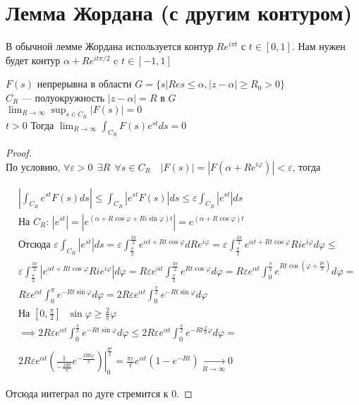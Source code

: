 \documentclass[a4paper, fleqn]{report}
\begin{document}
\section {Лемма Жордана (с другим контуром)}
В обычной лемме Жордана используется контур $Re^{i\pi t}$ с $t \in [0, 1]$. Нам нужен будет контур $\alpha + Re^{i t \pi/2}$ c $t \in [-1, 1]$
\begin{Th*}
	$F(s)$ непрерывна в области $G = \{s | Res \le  \alpha, |z-\alpha| \ge  R_0 > 0\}$ \\
	$C_R$ --- полуокружность $|z-\alpha| = R$ в $G$ \\
	$\lim_{R \to \infty} \sup_{s \in C_R} |F(s)| = 0$ \\
	$t > 0$
	Тогда $\lim_{R \to \infty} \int_{C_R} F(s)e^{st}ds = 0$
\end{Th*}
\begin{proof} $ $\\
По условию, $\forall \varepsilon > 0 \ \  \exists R \ \ \forall s \in C_R \quad \left| F(s) \right| = \left| F\left(\alpha + Re^{i\varphi}\right) \right|  < \varepsilon$, тогда

\begin{align*}
    & \left|\int_{C_R} e^{st} F(s) ds\right| \le
      \int_{C_R} \left|e^{st} F(s)\right| ds \le
      \varepsilon \int_{C_R} \left|e^{st}\right| ds  \\
    & \text{На $C_R$: } \left|e^{st}\right| = \left|e^{\left(\alpha+R\cos\varphi+Ri\sin\varphi\right)t}\right| = e^{\left(\alpha + R\cos\varphi\right) t} \\
    & \text{Отсюда } \varepsilon \int_{C_R} \left|e^{st}\right| ds = 
      \varepsilon \int_{\frac{\pi}{2}}^{\frac{3\pi}{2}} e^{\alpha t + R t \cos \varphi} dRe^{i\varphi} = 
      \varepsilon \int_{\frac{\pi}{2}}^{\frac{3\pi}{2}} e^{\alpha t + R t \cos \varphi} R i e^{i\varphi} d\varphi \le  \\
    & \varepsilon \int_{\frac{\pi}{2}}^{\frac{3\pi}{2}} \left|e^{\alpha t + R t \cos \varphi} R i e^{i\varphi} \right| d\varphi = 
      R\varepsilon e^{\alpha t} \int_{\frac{\pi}{2}}^{\frac{3\pi}{2}} e^{R t \cos\varphi} d\varphi = 
      R\varepsilon e^{\alpha t} \int_{0}^{\frac{\pi}{2}} e^{R t \cos \left(\varphi + \frac{pi}{2}\right)} d\varphi = \\
    & R\varepsilon e^{\alpha t} \int_{0}^{\pi} e^{-R t \sin\varphi} d\varphi = 
      2R\varepsilon e^{\alpha t} \int_{0}^{\frac{\pi}{2}} e^{-R t \sin\varphi} d\varphi \\
    & \text{На $[0, \frac{\pi}{2}]$ } \sin\varphi \ge \frac{2}{\pi} \varphi \\
    & \implies 2R\varepsilon e^{\alpha t} \int_{0}^{\frac{\pi}{2}} e^{-R t \sin\varphi} d\varphi \le
      2R\varepsilon e^{\alpha t} \int_{0}^{\frac{\pi}{2}} e^{-R t \frac{2}{\pi}\varphi} d\varphi = \\
    & 2R\varepsilon e^{\alpha t} \left.\left( \frac{1}{-\frac{2Rt}{\pi}}e^{- \frac{2 R t \varphi}{\pi}} \right) \right|_0^{\frac{pi}{2}} = 
         \frac{\pi\varepsilon}{t} e^{\alpha t} \left(1 - e^{- R t} \right) \xrightarrow[R \to \infty]{} 0
\end{align*}

Отсюда интеграл по дуге стремится к $0$.
\end{proof}
\end{document}
